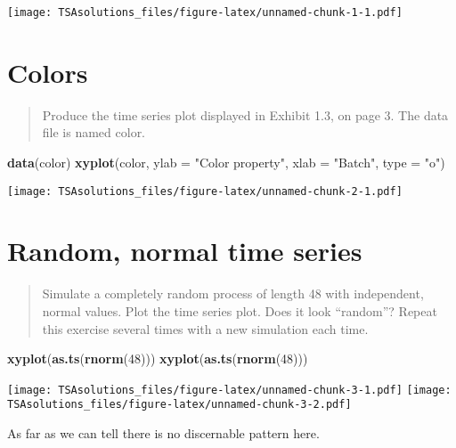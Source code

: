 \documentclass[]{book}
\newenvironment{Shaded}{\begin{snugshade}}{\end{snugshade}}
\newcommand{\KeywordTok}[1]{\textcolor[rgb]{0.13,0.29,0.53}{\textbf{{#1}}}}
\newcommand{\DataTypeTok}[1]{\textcolor[rgb]{0.13,0.29,0.53}{{#1}}}
\newcommand{\DecValTok}[1]{\textcolor[rgb]{0.00,0.00,0.81}{{#1}}}
\newcommand{\StringTok}[1]{\textcolor[rgb]{0.31,0.60,0.02}{{#1}}}
\newcommand{\NormalTok}[1]{{#1}}
\begin{document}
\texttt{[image: TSAsolutions\_files/figure-latex/unnamed-chunk-1-1.pdf]}

\section{Colors}\label{colors}

\begin{quote}
Produce the time series plot displayed in Exhibit 1.3, on page 3. The
data file is named color.
\end{quote}

\begin{Shaded}
\begin{Highlighting}[]
\KeywordTok{data}\NormalTok{(color)}
\KeywordTok{xyplot}\NormalTok{(color, }\DataTypeTok{ylab =} \StringTok{"Color property"}\NormalTok{, }\DataTypeTok{xlab =} \StringTok{"Batch"}\NormalTok{, }\DataTypeTok{type =} \StringTok{"o"}\NormalTok{)}
\end{Highlighting}
\end{Shaded}

\texttt{[image: TSAsolutions\_files/figure-latex/unnamed-chunk-2-1.pdf]}

\section{Random, normal time series}\label{random-normal-time-series}

\begin{quote}
Simulate a completely random process of length 48 with independent,
normal values. Plot the time series plot. Does it look ``random''?
Repeat this exercise several times with a new simulation each time.
\end{quote}

\begin{Shaded}
\begin{Highlighting}[]
\KeywordTok{xyplot}\NormalTok{(}\KeywordTok{as.ts}\NormalTok{(}\KeywordTok{rnorm}\NormalTok{(}\DecValTok{48}\NormalTok{)))}
\KeywordTok{xyplot}\NormalTok{(}\KeywordTok{as.ts}\NormalTok{(}\KeywordTok{rnorm}\NormalTok{(}\DecValTok{48}\NormalTok{)))}
\end{Highlighting}
\end{Shaded}

\texttt{[image: TSAsolutions\_files/figure-latex/unnamed-chunk-3-1.pdf]}
\texttt{[image: TSAsolutions\_files/figure-latex/unnamed-chunk-3-2.pdf]}

As far as we can tell there is no discernable pattern here.
\end{document}
